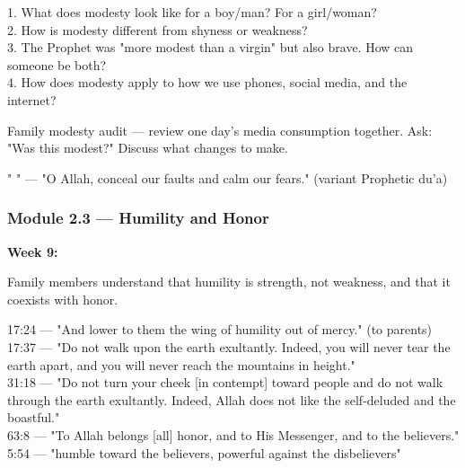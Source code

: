 \documentclass[11pt,a4paper]{article}
\begin{document}
\begin{discussionbox} 1. What does modesty look like for a boy/man? For a girl/woman? \\ 2. How is modesty different from shyness or weakness? \\ 3. The Prophet was "more modest than a virgin" but also brave. How can someone be both? \\ 4. How does modesty apply to how we use phones, social media, and the internet? \end{discussionbox}

\begin{activitybox} Family modesty audit --- review one day's media consumption together. Ask: "Was this modest?" Discuss what changes to make. \end{activitybox}

\begin{duabox} "    " --- "O Allah, conceal our faults and calm our fears." (variant Prophetic du'a) \end{duabox}

\vspace{6pt}\noindent{\color{border}\rule{\textwidth}{0.5pt}}\vspace{6pt}

\subsubsection*{Module 2.3 --- Humility and Honor}
\textbf{Week 9:} 

\begin{outcomebox} Family members understand that humility is strength, not weakness, and that it coexists with honor. \end{outcomebox}

\begin{quranbox} 17:24 --- "And lower to them the wing of humility out of mercy." (to parents) \\ 17:37 --- "Do not walk upon the earth exultantly. Indeed, you will never tear the earth apart, and you will never reach the mountains in height." \\ 31:18 --- "Do not turn your cheek [in contempt] toward people and do not walk through the earth exultantly. Indeed, Allah does not like the self-deluded and the boastful." \\ 63:8 --- "To Allah belongs [all] honor, and to His Messenger, and to the believers." \\ 5:54 --- "humble toward the believers, powerful against the disbelievers" \end{quranbox}
\end{document}
